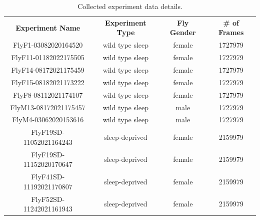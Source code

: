 \begin{table}[htb!]
	\begin{adjustbox}{width=1\textwidth}
		\begin{tabular}{c c c c}
			\toprule
			\multicolumn{1}{c}{\textbf{Experiment Name}} & \multicolumn{1}{c}{\textbf{Experiment Type}} & \multicolumn{1}{c}{\textbf{Fly Gender}} & \multicolumn{1}{c}{\textbf{\# of Frames}} \\
			\cmidrule(lr){1-1}\cmidrule(lr){2-2}\cmidrule(lr){3-3}\cmidrule(lr){4-4}
			FlyF1-03082020164520                         & wild type sleep                              & female                                  & 1727979                                   \\
			FlyF11-01182022175505                        & wild type sleep                              & female                                  & 1727979                                   \\
			FlyF14-08172021175459                        & wild type sleep                              & female                                  & 1727979                                   \\
			FlyF15-08182021173222                        & wild type sleep                              & female                                  & 1727979                                   \\
			FlyF8-08112021174107                         & wild type sleep                              & female                                  & 1727979                                   \\
			FlyM13-08172021175457                        & wild type sleep                              & male                                    & 1727979                                   \\
			FlyM4-03062020153616                         & wild type sleep                              & male                                    & 1727979                                   \\
			FlyF19SD-11052021164243                      & sleep-deprived                               & female                                  & 2159979                                   \\
			FlyF19SD-11152020170647                      & sleep-deprived                               & female                                  & 2159979                                   \\
			FlyF41SD-11192021170807                      & sleep-deprived                               & female                                  & 2159979                                   \\
			FlyF52SD-11242021161943                      & sleep-deprived                               & female                                  & 2159979                                   \\
			\bottomrule
		\end{tabular}
	\end{adjustbox}
	\caption{Collected experiment data details. \label{table:experiment-details}}
\end{table}

